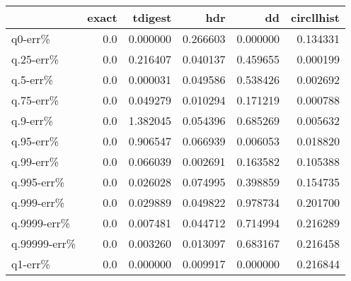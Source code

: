 \begin{tabular}{lrrrrr}
\toprule
{} &  exact &   tdigest &       hdr &        dd &  circllhist \\
\midrule
q0-err\%      &    0.0 &  0.000000 &  0.266603 &  0.000000 &    0.134331 \\
q.25-err\%    &    0.0 &  0.216407 &  0.040137 &  0.459655 &    0.000199 \\
q.5-err\%     &    0.0 &  0.000031 &  0.049586 &  0.538426 &    0.002692 \\
q.75-err\%    &    0.0 &  0.049279 &  0.010294 &  0.171219 &    0.000788 \\
q.9-err\%     &    0.0 &  1.382045 &  0.054396 &  0.685269 &    0.005632 \\
q.95-err\%    &    0.0 &  0.906547 &  0.066939 &  0.006053 &    0.018820 \\
q.99-err\%    &    0.0 &  0.066039 &  0.002691 &  0.163582 &    0.105388 \\
q.995-err\%   &    0.0 &  0.026028 &  0.074995 &  0.398859 &    0.154735 \\
q.999-err\%   &    0.0 &  0.029889 &  0.049822 &  0.978734 &    0.201700 \\
q.9999-err\%  &    0.0 &  0.007481 &  0.044712 &  0.714994 &    0.216289 \\
q.99999-err\% &    0.0 &  0.003260 &  0.013097 &  0.683167 &    0.216458 \\
q1-err\%      &    0.0 &  0.000000 &  0.009917 &  0.000000 &    0.216844 \\
\bottomrule
\end{tabular}
